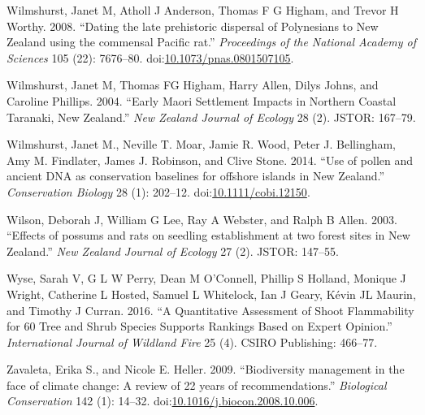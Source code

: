 \hypertarget{ref-Wilmshurst2008}{}
Wilmshurst, Janet M, Atholl J Anderson, Thomas F G Higham, and Trevor H
Worthy. 2008. ``Dating the late prehistoric dispersal of Polynesians to
New Zealand using the commensal Pacific rat.'' \emph{Proceedings of the
National Academy of Sciences} 105 (22): 7676--80.
doi:\href{https://doi.org/10.1073/pnas.0801507105}{10.1073/pnas.0801507105}.

\hypertarget{ref-Wilmshurst2004}{}
Wilmshurst, Janet M, Thomas FG Higham, Harry Allen, Dilys Johns, and
Caroline Phillips. 2004. ``Early Maori Settlement Impacts in Northern
Coastal Taranaki, New Zealand.'' \emph{New Zealand Journal of Ecology}
28 (2). JSTOR: 167--79.

\hypertarget{ref-Wilmshurst2014}{}
Wilmshurst, Janet M., Neville T. Moar, Jamie R. Wood, Peter J.
Bellingham, Amy M. Findlater, James J. Robinson, and Clive Stone. 2014.
``Use of pollen and ancient DNA as conservation baselines for offshore
islands in New Zealand.'' \emph{Conservation Biology} 28 (1): 202--12.
doi:\href{https://doi.org/10.1111/cobi.12150}{10.1111/cobi.12150}.

\hypertarget{ref-wilson2003effects}{}
Wilson, Deborah J, William G Lee, Ray A Webster, and Ralph B Allen.
2003. ``Effects of possums and rats on seedling establishment at two
forest sites in New Zealand.'' \emph{New Zealand Journal of Ecology} 27
(2). JSTOR: 147--55.

\hypertarget{ref-wyse2016quantitative}{}
Wyse, Sarah V, G L W Perry, Dean M O'Connell, Phillip S Holland, Monique
J Wright, Catherine L Hosted, Samuel L Whitelock, Ian J Geary, Kévin JL
Maurin, and Timothy J Curran. 2016. ``A Quantitative Assessment of Shoot
Flammability for 60 Tree and Shrub Species Supports Rankings Based on
Expert Opinion.'' \emph{International Journal of Wildland Fire} 25 (4).
CSIRO Publishing: 466--77.

\hypertarget{ref-Zavaleta2009}{}
Zavaleta, Erika S., and Nicole E. Heller. 2009. ``Biodiversity
management in the face of climate change: A review of 22 years of
recommendations.'' \emph{Biological Conservation} 142 (1): 14--32.
doi:\href{https://doi.org/10.1016/j.biocon.2008.10.006}{10.1016/j.biocon.2008.10.006}.
